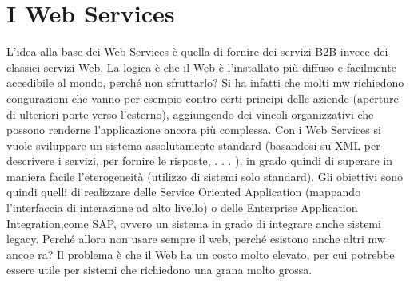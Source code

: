 \section{I Web Services}
L'idea alla base dei Web Services è quella di fornire dei servizi B2B invece dei
classici servizi Web. La logica è che il Web è l'installato più diffuso e facilmente
accedibile al mondo, perché non sfruttarlo?
Si ha infatti che molti mw richiedono congurazioni che vanno per esempio
contro certi principi delle aziende (aperture di ulteriori porte verso l'esterno),
aggiungendo dei vincoli organizzativi che possono renderne l'applicazione ancora
più complessa.
Con i Web Services si vuole sviluppare un sistema assolutamente standard
(basandosi su XML per descrivere i servizi, per fornire le risposte, . . . ), in grado quindi di superare in maniera
facile l'eterogeneità (utilizzo di sistemi solo
standard). Gli obiettivi sono quindi quelli di realizzare delle Service Oriented
Application (mappando l'interfaccia di interazione ad alto livello) o delle Enterprise Application Integration,come SAP,
ovvero un sistema in grado di integrare
anche sistemi legacy.
Perché allora non usare sempre il web, perché esistono anche altri mw ancoe
ra? Il problema è che il Web ha un costo molto elevato, per cui potrebbe essere
utile per sistemi che richiedono una grana molto grossa.
